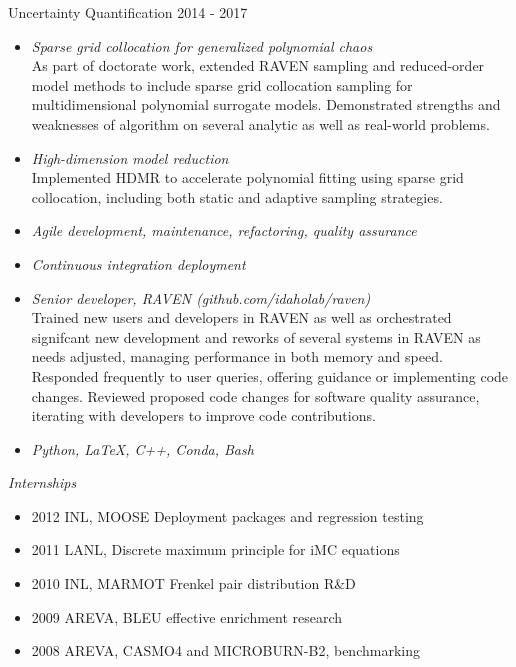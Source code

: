 \documentclass{res}
\begin{document}
\begin{resume}
Uncertainty Quantification \hfill    2014 - 2017
\begin{itemize} \itemsep -2pt
  \item \emph{Sparse grid collocation for generalized polynomial chaos} \\
  As part of doctorate work, extended RAVEN sampling and reduced-order model methods to include
  sparse grid collocation sampling for multidimensional polynomial surrogate models. Demonstrated
  strengths and weaknesses of algorithm on several analytic as well as real-world problems.
  \item \emph{High-dimension model reduction} \\
  Implemented HDMR to accelerate polynomial fitting using sparse grid collocation, including both
  static and adaptive sampling strategies.
  \item \emph{Agile development, maintenance, refactoring, quality assurance}
  \item \emph{Continuous integration deployment}
  \item \emph{Senior developer, RAVEN (github.com/idaholab/raven)} \\
  Trained new users and developers in RAVEN as well as orchestrated signifcant new development and reworks
  of several systems in RAVEN as needs adjusted, managing performance in both memory and speed.
  Responded frequently to user queries, offering guidance or implementing code changes. Reviewed
  proposed code changes for software quality assurance, iterating with developers to improve code
  contributions.
  \item \emph{Python, LaTeX, C++, Conda, Bash}
\end{itemize} \vspace{-6pt}

{\sl Internships} %
\begin{itemize} \itemsep -2pt
  \item 2012 INL, MOOSE Deployment packages and regression testing
  \item 2011 LANL, Discrete maximum principle for iMC equations
  \item 2010 INL, MARMOT Frenkel pair distribution R\&D
  \item 2009 AREVA, BLEU effective enrichment research
  \item 2008 AREVA, CASMO4 and MICROBURN-B2, benchmarking
\end{itemize} \vspace{-6pt}


\end{resume}
\end{document}
